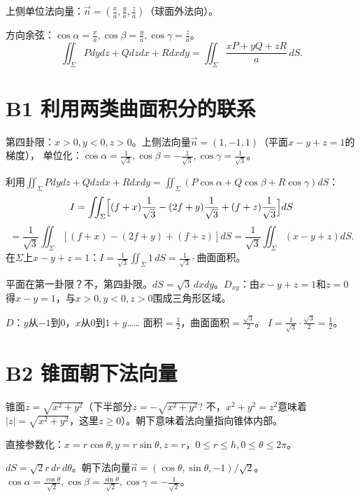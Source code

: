\documentclass[12pt,a4paper]{ctexart}
\newcommand{\answerbox}[1]{\begin{center}\fbox{\color{red}\large\bfseries #1}\end{center}}
\begin{document}
上侧单位法向量：$\vec n=(\frac{x}{a},\frac{y}{a},\frac{z}{a})$（球面外法向）。

方向余弦：$\cos\alpha=\frac{x}{a},\cos\beta=\frac{y}{a},\cos\gamma=\frac{z}{a}$。
\[\iint_\Sigma P dydz+Q dzdx+R dxdy
   =\iint_\Sigma\frac{xP+yQ+zR}{a}\,dS.\]
\answerbox{$\iint_\Sigma\frac{xP+yQ+zR}{a}dS$}

\section{B1 利用两类曲面积分的联系}


第四卦限：$x>0,y<0,z>0$。上侧法向量$\vec n=(1,-1,1)$（平面$x-y+z=1$的梯度），
单位化：$\cos\alpha=\frac1{\sqrt3},\cos\beta=-\frac1{\sqrt3},\cos\gamma=\frac1{\sqrt3}$。

利用$\iint_\Sigma P dydz+Q dzdx+R dxdy = \iint_\Sigma(P\cos\alpha+Q\cos\beta+R\cos\gamma)dS$：
\[I=\iint_\Sigma\Bigl[(f+x)\frac1{\sqrt3}-(2f+y)\frac1{\sqrt3}+(f+z)\frac1{\sqrt3}\Bigr]dS\]
\[=\frac1{\sqrt3}\iint_\Sigma[(f+x)-(2f+y)+(f+z)]dS
   =\frac1{\sqrt3}\iint_\Sigma(x-y+z)dS.\]
在$\Sigma$上$x-y+z=1$：$I=\frac1{\sqrt3}\iint_\Sigma 1\,dS=\frac1{\sqrt3}\cdot$曲面面积。

平面在第一卦限？不，第四卦限。$dS=\sqrt3\,dxdy$。$D_{xy}$：由$x-y+z=1$和$z=0$得$x-y=1$，与$x>0,y<0,z>0$围成三角形区域。

$D$：$y$从$-1$到$0$，$x$从$0$到$1+y$…… 面积$=\frac12$，曲面面积$=\frac{\sqrt3}{2}$。
$I=\frac1{\sqrt3}\cdot\frac{\sqrt3}{2}=\frac12$。
\answerbox{$\frac12$}

\section{B2 锥面朝下法向量}


锥面$z=\sqrt{x^2+y^2}$（下半部分$z=-\sqrt{x^2+y^2}$? 不，$x^2+y^2=z^2$意味着$|z|=\sqrt{x^2+y^2}$，这里$z\ge0$）。朝下意味着法向量指向锥体内部。

直接参数化：$x=r\cos\theta,y=r\sin\theta,z=r$，$0\le r\le h,0\le\theta\le2\pi$。

$dS=\sqrt{2}r\,dr\,d\theta$。朝下法向量$\vec n=(\cos\theta,\sin\theta,-1)/\sqrt2$。
$\cos\alpha=\frac{\cos\theta}{\sqrt2},\cos\beta=\frac{\sin\theta}{\sqrt2},\cos\gamma=-\frac1{\sqrt2}$。
\end{document}
